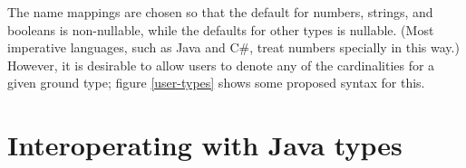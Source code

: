 \documentclass{article}
\begin{document}
The name mappings are chosen so that the default for numbers, strings,
and booleans is non-nullable, while the defaults for other types is
nullable.  (Most imperative languages, such as Java and C\#, treat
numbers specially in this way.)  However, it is desirable to allow
users to denote any of the cardinalities for a given ground type; 
figure \ref{user-types} shows some proposed syntax for this.


\section{Interoperating with Java types}






\end{document}
